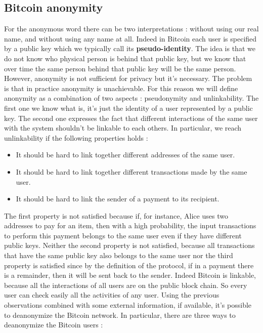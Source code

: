 \subsection{Bitcoin anonymity}
For the anonymous word there can be two interpretations : without using our real name, and without using any name at all. Indeed in Bitcoin each user is specified by a public key which we typically call its \textbf{pseudo-identity}. The idea is that we do not know who physical person is behind that public key, but we know that over time the same person behind that public key will be the same person. However, anonymity is not sufficient for privacy but it's necessary. The problem is that in practice anonymity is unachievable. For this reason we will define anonymity as a combination of two aspects : pseudonymity and unlinkability. The first one we know what is, it's just the identity of a user represented by a public key. The second one expresses the fact that different interactions of the same user with the system shouldn't be linkable to each others. In particular, we reach unlinkability if the following properties holds :
\begin{itemize}
\item It should be hard to link together different addresses of the same user.
\item It should be hard to link together different transactions made by the same user.
\item It should be hard to link the sender of a payment to its recipient.
\end{itemize}
The first property is not satisfied because if, for instance, Alice uses two addresses to pay for an item, then with a high probability, the input transactions to perform this payment belongs to the same user even if they have different public keys. Neither the second property is not satisfied, because all transactions that have the same public key also belongs to the same user nor the third property is satisfied since by the definition of the protocol, if in a payment there is a remainder, then it will be sent back to the sender. Indeed Bitcoin is linkable, because all the interactions of all users are on the public block chain. So every user can check easily all the activities of any user. Using the previous observations combined with some external information, if available, it's possible to deanonymize the Bitcoin network. In particular, there are three ways to deanonymize the Bitcoin users :

